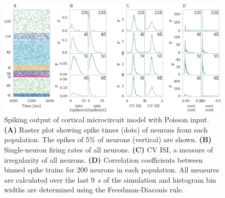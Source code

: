 \documentclass[utf8]{frontiersSCNS} %
\begin{document}
\begin{figure}
    \begin{center}
        \includegraphics[width=180mm]{figures/microcircuit_accuracy}
    \end{center}
    \caption{Spiking output of cortical microcircuit model with Poisson input.  
    \textbf{(A)} Raster plot showing spike times (dots) of neurons from each population. 
    The spikes of 5\% of neurons (vertical) are shown.
    \textbf{(B)} Single-neuron firing rates of all neurons.
    \textbf{(C)} CV ISI, a measure of irregularity of all neurons.
    \textbf{(D)} Correlation coefficients between binned spike trains for \num{200} neurons in each population.
    All measures are calculated over the last \SI{9}{\second} of the simulation and histogram bin widths are determined using the Freedman-Diaconis rule.}
    \label{fig:microcircuit_accuracy}
\end{figure}
\end{document}
